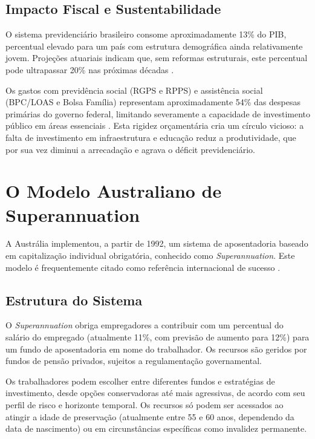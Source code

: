 \subsection{Impacto Fiscal e Sustentabilidade}

O sistema previdenciário brasileiro consome aproximadamente 13\% do PIB, percentual elevado para um país com estrutura demográfica ainda relativamente jovem. Projeções atuariais indicam que, sem reformas estruturais, este percentual pode ultrapassar 20\% nas próximas décadas \cite{tafner2019}.

Os gastos com previdência social (RGPS e RPPS) e assistência social (BPC/LOAS e Bolsa Família) representam aproximadamente 54\% das despesas primárias do governo federal, limitando severamente a capacidade de investimento público em áreas essenciais \cite{ifi2023}. Esta rigidez orçamentária cria um círculo vicioso: a falta de investimento em infraestrutura e educação reduz a produtividade, que por sua vez diminui a arrecadação e agrava o déficit previdenciário.

\section{O Modelo Australiano de Superannuation}

A Austrália implementou, a partir de 1992, um sistema de aposentadoria baseado em capitalização individual obrigatória, conhecido como \textit{Superannuation}. Este modelo é frequentemente citado como referência internacional de sucesso \cite{bateman2001}.

\subsection{Estrutura do Sistema}

O \textit{Superannuation} obriga empregadores a contribuir com um percentual do salário do empregado (atualmente 11\%, com previsão de aumento para 12\%) para um fundo de aposentadoria em nome do trabalhador. Os recursos são geridos por fundos de pensão privados, sujeitos a regulamentação governamental.

Os trabalhadores podem escolher entre diferentes fundos e estratégias de investimento, desde opções conservadoras até mais agressivas, de acordo com seu perfil de risco e horizonte temporal. Os recursos só podem ser acessados ao atingir a idade de preservação (atualmente entre 55 e 60 anos, dependendo da data de nascimento) ou em circunstâncias específicas como invalidez permanente.

